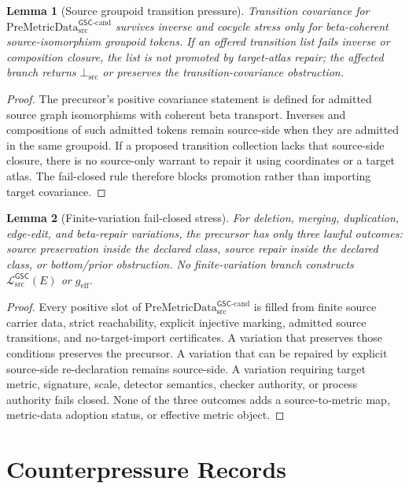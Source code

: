 \documentclass[11pt]{article}
\newcommand{\PreMetricData}{\mathrm{PreMetricData}_{\mathrm{src}}^{\mathsf{GSC}\mbox{-}\mathrm{cand}}}
\newcommand{\MetricData}{\mathcal{L}_{\mathrm{src}}^{\mathsf{GSC}}}
\newcommand{\BottomSrc}{\bot_{\mathrm{src}}}
\newcommand{\geff}{g_{\mathrm{eff}}}
\newtheorem{lemma}{Lemma}
\begin{document}
\begin{lemma}[Source groupoid transition pressure]
Transition covariance for \(\PreMetricData\) survives inverse and cocycle
stress only for beta-coherent source-isomorphism groupoid tokens. If an
offered transition list fails inverse or composition closure, the list is not
promoted by target-atlas repair; the affected branch returns \(\BottomSrc\) or
preserves the transition-covariance obstruction.
\end{lemma}

\begin{proof}
The precursor's positive covariance statement is defined for admitted source
graph isomorphisms with coherent beta transport. Inverses and compositions of
such admitted tokens remain source-side when they are admitted in the same
groupoid. If a proposed transition collection lacks that source-side closure,
there is no source-only warrant to repair it using coordinates or a target
atlas. The fail-closed rule therefore blocks promotion rather than importing
target covariance.
\end{proof}

\begin{lemma}[Finite-variation fail-closed stress]
For deletion, merging, duplication, edge-edit, and beta-repair variations, the
precursor has only three lawful outcomes: source preservation inside the
declared class, source repair inside the declared class, or bottom/prior
obstruction. No finite-variation branch constructs \(\MetricData(E)\) or
\(\geff\).
\end{lemma}

\begin{proof}
Every positive slot of \(\PreMetricData\) is filled from finite source carrier
data, strict reachability, explicit injective marking, admitted source
transitions, and no-target-import certificates. A variation that preserves
those conditions preserves the precursor. A variation that can be repaired by
explicit source-side re-declaration remains source-side. A variation requiring
target metric, signature, scale, detector semantics, checker authority, or
process authority fails closed. None of the three outcomes adds a
source-to-metric map, metric-data adoption status, or effective metric object.
\end{proof}

\section{Counterpressure Records}
\end{document}
